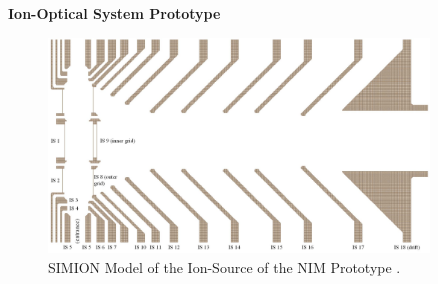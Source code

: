 		

		
		\textbf{Ion-Optical System Prototype}\\
		
		\begin{figure}[h] %
			\centering
			\includegraphics[width=0.9\textwidth]{Setup/Prototype_IS_sim.jpg}
			\caption{SIMION Model of the Ion-Source of the NIM Prototype \cite{Diss_Meyer}.}
			\label{fig:SetupProtoISSim}
		\end{figure}
		
